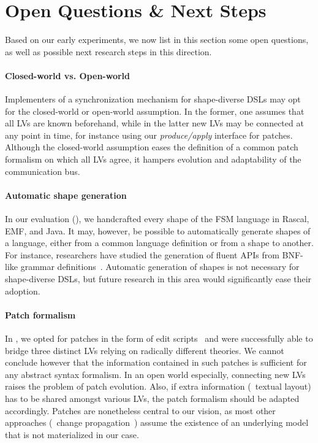 \section{Open Questions \& Next Steps}
\label{sec:discussion}
Based on our early experiments, we now list in this section some open questions, as well as possible next research steps in this direction.

\paragraph{Closed-world vs. Open-world}
Implementers of a synchronization mechanism for shape-diverse DSLs may opt for the closed-world or open-world assumption.
In the former, one assumes that all LVs are known beforehand, while in the latter new LVs may be connected at any point in time, for instance using our \emph{produce/apply} interface for patches.
Although the closed-world assumption eases the definition of a common patch formalism on which all LVs agree, it hampers evolution and adaptability of the communication bus.

\paragraph{Automatic shape generation}
In our evaluation (), we handcrafted every shape of the FSM language in Rascal, EMF, and Java.
It may, however, be possible to automatically generate shapes of a language, either from a common language definition or from a shape to another.
For instance, researchers have studied the generation of fluent APIs from BNF-like grammar definitions~\cite{nakamaru2017silverchain}.
Automatic generation of shapes is not necessary for shape-diverse DSLs, but future research in this area would significantly ease their adoption.

\paragraph{Patch formalism}
In \prism, we opted for patches in the form of edit scripts~\cite{rozen2017towards} and were successfully able to bridge three distinct LVs relying on radically different theories.
We cannot conclude however that the information contained in such patches is sufficient for any abstract syntax formalism.
In an open world especially, connecting new LVs raises the problem of patch evolution.
Also, if extra information (\eg~textual layout) has to be shared amongst various LVs, the patch formalism should be adapted accordingly. %
Patches are nonetheless central to our vision, as most other approaches (\eg~change propagation~\cite{DBLP:conf/etaps/SemerathDHV16}) assume the existence of an underlying model that is not materialized in our case.

